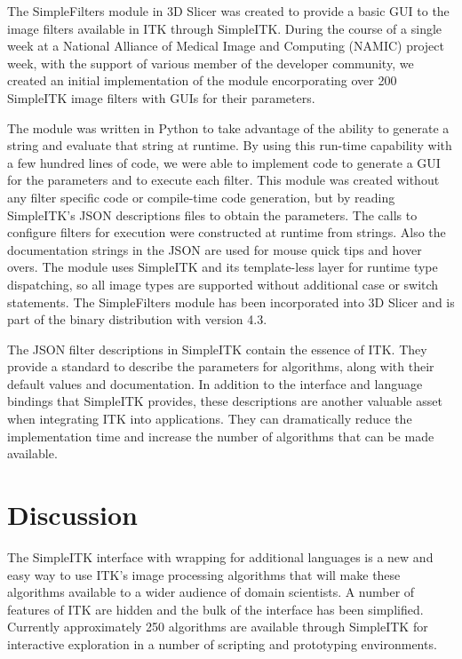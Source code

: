 \documentclass{frontiersMED} %
\begin{document}
The SimpleFilters module in 3D Slicer was created to provide a basic
GUI to the image filters available in ITK through SimpleITK. During
the course of a single week at a National Alliance of Medical Image
and Computing (NAMIC) project week, with the support of various member
of the developer community, we created an initial implementation of the module
encorporating over 200 SimpleITK image filters with GUIs
for their parameters.

The module was written in Python to take advantage of the ability
to generate a string and evaluate that string at runtime.
By using this run-time capability with a few hundred lines of
code, we were able to implement code to generate a GUI for the
parameters and to execute each filter. This module was created without any
filter specific code or compile-time code generation, but by
reading SimpleITK's JSON descriptions files to obtain the
parameters. The calls to configure filters for execution were
constructed at runtime from strings. Also the documentation
strings in the JSON are used for mouse quick tips and hover overs. The
module uses SimpleITK and its template-less layer for runtime type
dispatching, so all image types are supported without additional case
or switch statements. The SimpleFilters module has been incorporated
into 3D Slicer and is part of the binary distribution with version 4.3.

The JSON filter descriptions in SimpleITK contain the essence of
ITK. They provide a standard to describe the parameters for
algorithms, along with their default values and documentation. In
addition to the interface and language bindings that SimpleITK provides,
these descriptions are another valuable asset when integrating ITK into
applications. They can dramatically reduce the implementation time and
increase the number of algorithms that can be made available.

\section{Discussion}
The SimpleITK interface with wrapping for additional languages is a new
and easy way to use ITK's image processing algorithms that will
make these algorithms available to a wider audience of domain scientists.
A number of features of ITK are hidden and the bulk of
the interface has been simplified. Currently approximately 250
algorithms are available through SimpleITK for interactive
exploration in a number of scripting and prototyping environments.
\end{document}
